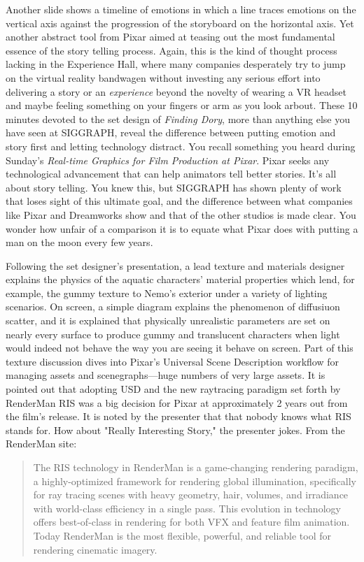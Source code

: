 \documentclass[../main.tex]{subfiles}
\begin{document}
Another slide shows a timeline of emotions in which a line traces emotions on the vertical axis against the progression of the storyboard on the horizontal axis. Yet another abstract tool from Pixar aimed at teasing out the most fundamental essence of the story telling process. Again, this is the kind of thought process lacking in the Experience Hall, where many companies desperately try to jump on the virtual reality bandwagen without investing any serious effort into delivering a story or an \textit{experience} beyond the novelty of wearing a VR headset and maybe feeling something on your fingers or arm as you look arbout. These 10 minutes devoted to the set design of \textit{Finding Dory}, more than anything else you have seen at SIGGRAPH, reveal the difference between putting emotion and story first and letting technology distract. You recall something you heard during Sunday's \textit{Real-time Graphics for Film Production at Pixar}. Pixar seeks any technological advancement that can help animators tell better stories. It's all about story telling. You knew this, but SIGGRAPH has shown plenty of work that loses sight of this ultimate goal, and the difference between what companies like Pixar and Dreamworks show and that of the other studios is made clear. You wonder how unfair of a comparison it is to equate what Pixar does with putting a man on the moon every few years.

Following the set designer's presentation, a lead texture and materials designer explains the physics of the aquatic characters' material properties which lend, for example, the gummy texture to Nemo's exterior under a variety of lighting scenarios. On screen, a simple diagram explains the phenomenon of diffusiuon scatter, and it is explained that physically unrealistic parameters are set on nearly every surface to produce gummy and translucent characters when light would indeed not behave the way you are seeing it behave on screen. Part of this texture discussion dives into Pixar's Universal Scene Description workflow for managing assets and scenegraphs---huge numbers of very large assets. It is pointed out that adopting USD and the new raytracing paradigm set forth by RenderMan RIS was a big decision for Pixar at approximately 2 years out from the film's release. It is noted by the presenter that that nobody knows what RIS stands for. How about "Really Interesting Story," the presenter jokes. From the RenderMan site:

\begin{quote}
The RIS technology in RenderMan is a game-changing rendering paradigm, a highly-optimized framework for rendering global illumination, specifically for ray tracing scenes with heavy geometry, hair, volumes, and irradiance with world-class efficiency in a single pass. This evolution in technology offers best-of-class in rendering for both VFX and feature film animation. Today RenderMan is the most flexible, powerful, and reliable tool for rendering cinematic imagery.  
\end{quote}
\end{document}
